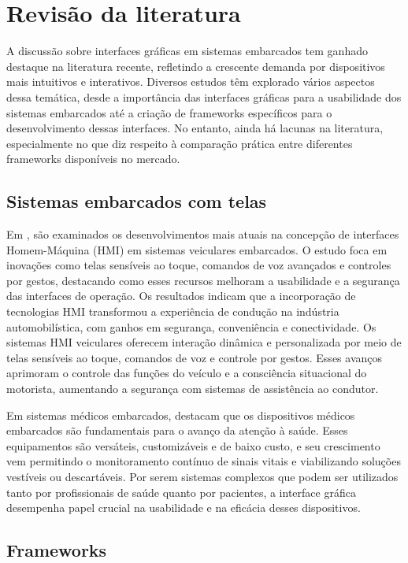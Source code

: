\chapter{Revisão da literatura}

A discussão sobre interfaces gráficas em sistemas embarcados tem ganhado destaque na literatura recente, refletindo a crescente demanda por dispositivos mais intuitivos e interativos. Diversos estudos têm explorado vários aspectos dessa temática, desde a importância das interfaces gráficas para a usabilidade dos sistemas embarcados até a criação de frameworks específicos para o desenvolvimento dessas interfaces. No entanto, ainda há lacunas na literatura, especialmente no que diz respeito à comparação prática entre diferentes frameworks disponíveis no mercado.

\section{Sistemas embarcados com telas}

Em \cite{GraziosiSistemasEmbarcados}, são examinados os desenvolvimentos mais atuais na concepção de interfaces Homem-Máquina (HMI) em sistemas veiculares embarcados. O estudo foca em inovações como telas sensíveis ao toque, comandos de voz avançados e controles por gestos, destacando como esses recursos melhoram a usabilidade e a segurança das interfaces de operação. Os resultados indicam que a incorporação de tecnologias HMI transformou a experiência de condução na indústria automobilística, com ganhos em segurança, conveniência e conectividade. Os sistemas HMI veiculares oferecem interação dinâmica e personalizada por meio de telas sensíveis ao toque, comandos de voz e controle por gestos. Esses avanços aprimoram o controle das funções do veículo e a consciência situacional do motorista, aumentando a segurança com sistemas de assistência ao condutor.

Em sistemas médicos embarcados, \cite{Arandia2022Embedded} destacam que os dispositivos médicos embarcados são fundamentais para o avanço da atenção à saúde. Esses equipamentos são versáteis, customizáveis e de baixo custo, e seu crescimento vem permitindo o monitoramento contínuo de sinais vitais e viabilizando soluções vestíveis ou descartáveis. Por serem sistemas complexos que podem ser utilizados tanto por profissionais de saúde quanto por pacientes, a interface gráfica desempenha papel crucial na usabilidade e na eficácia desses dispositivos.

\section{Frameworks}

